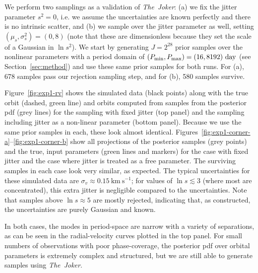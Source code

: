 \documentclass[manuscript, letterpaper]{aastex6}
\newcommand{\project}[1]{\textsl{#1}}
\newcommand{\samplername}{\project{The~Joker}}
\newcommand{\sectionname}{Section}
\newcommand{\figname}{Figure}
\newcommand{\kms}{\mathrm{km}~\mathrm{s}^{-1}}
\begin{document}
We perform two samplings as a validation of \samplername:
(a) we fix the jitter parameter $s^2 = 0$, i.e. we assume the uncertainties are
known perfectly and there is no intrinsic scatter, and (b) we sample over the
jitter parameter as well, setting $(\mu_s,\sigma^2_s) = (0,8)$ (note that these
are dimensionless because they set the scale of a Gaussian in $\ln s^2$).
We start by generating $J=2^{28}$ prior samples over the nonlinear parameters
with a period domain of $(P_{\rm min}, P_{\rm max}) = (16, 8192)~{\rm day}$ (see
\sectionname~\ref{sec:method}) and use these same prior samples for both runs.
For (a), 678 samples pass our rejection sampling step, and for (b), 580 samples
survive.

\figname~\ref{fig:exp1-rv} shows the simulated data (black points) along with
the true orbit (dashed, green line) and orbits computed from samples from the
posterior pdf (grey lines) for the sampling with fixed jitter (top panel) and
the sampling including jitter as a non-linear parameter (bottom panel).
Because we use the same prior samples in each, these look almost identical.
\figname s~\ref{fig:exp1-corner-a}--\ref{fig:exp1-corner-b} show all projections
of the posterior samples (grey points) and the true, input parameters (green
lines and markers) for the case with fixed jitter and the case where jitter is
treated as a free parameter.
The surviving samples in each case look very similar, as expected.
The typical uncertainties for these simulated data are $\sigma_v \approx
0.15~\kms$; for values of $\ln s \lesssim 3$ (where most are concentrated), this extra jitter is negligible compared to the uncertainties.
Note that samples above $\ln s \approx 5$ are mostly rejected, indicating that,
as constructed, the uncertainties are purely Gaussian and known.

In both cases, the modes in period-space are narrow with a variety of
separations, as can be seen in the radial-velocity curves plotted in the top
panel.
For small numbers of observations with poor phase-coverage, the posterior pdf
over orbital parameters is extremely complex and structured, but we are still
able to generate samples using \samplername.
\end{document}
